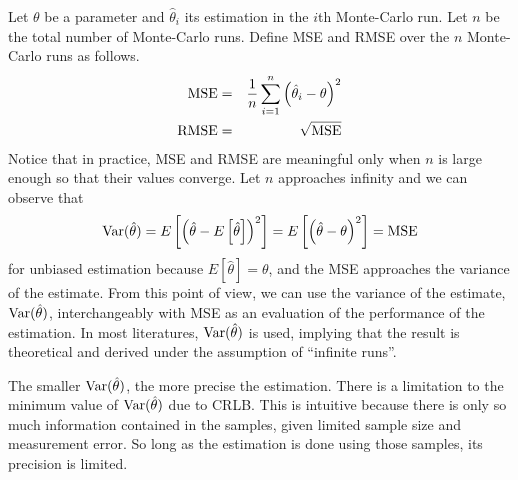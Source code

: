 Let $\theta$ be a parameter and $\hat{\theta}_i$ its estimation in the $i$th Monte-Carlo run. Let $n$ be the total number of Monte-Carlo runs. Define MSE and RMSE over the $n$ Monte-Carlo runs as follows.
\begin{eqnarray}
	\textup{MSE} &=& \dfrac{1}{n}\sum_{i=1}^{n}\left(\hat{\theta}_i-\theta\right)^2 \nonumber \\
	\textup{RMSE} &=& \sqrt{\textup{MSE}} \nonumber
\end{eqnarray}
Notice that in practice, MSE and RMSE are meaningful only when $n$ is large enough so that their values converge. Let $n$ approaches infinity and we can observe that
\begin{eqnarray}
	\textup{Var}(\hat{\theta}) = E\left[\left(\hat{\theta}-E\left[\hat{\theta}\right]\right)^2\right] = E\left[\left(\hat{\theta}-\theta\right)^2\right] = \textup{MSE} \nonumber
\end{eqnarray}
for unbiased estimation because $E\left[\hat{\theta}\right]=\theta$, and the MSE approaches the variance of the estimate. From this point of view, we can use the variance of the estimate, $\textup{Var}(\hat{\theta})$, interchangeably with MSE as an evaluation of the performance of the estimation. In most literatures, $\textup{Var}(\hat{\theta})$ is used, implying that the result is theoretical and derived under the assumption of ``infinite runs''.

The smaller $\textup{Var}(\hat{\theta})$, the more precise the estimation. There is a limitation to the minimum value of $\textup{Var}(\hat{\theta})$ due to CRLB. This is intuitive because there is only so much information contained in the samples, given limited sample size and measurement error. So long as the estimation is done using those samples, its precision is limited. 

